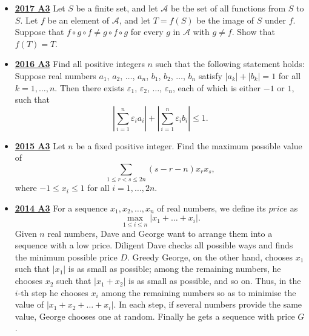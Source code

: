 \documentclass[11pt]{scrartcl}
\begin{document}
\begin{itemize}[leftmargin=*]
\begin{enumerate}[(1)]
    \item There exist distinct finite subsets $F$ and $G$ of $S$ such that $\sum_{x\in F}1/x=\sum_{x\in G}1/x$;
    \item There exists a positive rational number $r<1$ such that $\sum_{x\in F}1/x\neq r$ for all finite subsets $F$ of $S$.
\end{enumerate}
\item \href{https://artofproblemsolving.com/community/c6h1671322p10632599}{\textbf{2017 A3}} Let $S$ be a finite set, and let $\mathcal{A}$ be the set of all functions from $S$ to $S$. Let $f$ be an element of $\mathcal{A}$, and let $T=f(S)$ be the image of $S$ under $f$. Suppose that $f\circ g\circ f\ne g\circ f\circ g$ for every $g$ in $\mathcal{A}$ with $g\ne f$. Show that $f(T)=T$.
\item \href{https://artofproblemsolving.com/community/c6h1480716p8639312}{\textbf{2016 A3}} Find all positive integers $n$ such that the following statement holds: Suppose real numbers $a_1$, $a_2$, $\dots$, $a_n$, $b_1$, $b_2$, $\dots$, $b_n$ satisfy $|a_k|+|b_k|=1$ for all $k=1,\dots,n$. Then there exists $\varepsilon_1$, $\varepsilon_2$, $\dots$, $\varepsilon_n$, each of which is either $-1$ or $1$, such that
\[ \left| \sum_{i=1}^n \varepsilon_i a_i \right| + \left| \sum_{i=1}^n \varepsilon_i b_i \right| \leqslant 1. \]
\item \href{https://artofproblemsolving.com/community/c6h1268841p6622146}{\textbf{2015 A3}} 	Let $n$ be a fixed positive integer. Find the maximum possible value of\[ \sum_{1 \leqslant r < s \leqslant 2n} (s-r-n)x_rx_s, \]where $-1 \leqslant x_i \leqslant 1$ for all $i = 1, \dots , 2n$.
\item \href{https://artofproblemsolving.com/community/c6h1113180p5083537}{\textbf{2014 A3}} For a sequence $x_1,x_2,\dots,x_n$ of real numbers, we define its $\textit{price}$ as\[\max_{1\leqslant i\leqslant n}|x_1+\dots +x_i|.\]Given $n$ real numbers, Dave and George want to arrange them into a sequence with a low price. Diligent Dave checks all possible ways and finds the minimum possible price $D$. Greedy George, on the other hand, chooses $x_1$ such that $|x_1 |$ is as small as possible; among the remaining numbers, he chooses $x_2$ such that $|x_1 + x_2 |$ is as small as possible, and so on. Thus, in the $i$-th step he chooses $x_i$ among the remaining numbers so as to minimise the value of $|x_1 + x_2 + \dots + x_i |$. In each step, if several numbers provide the same value, George chooses one at random. Finally he gets a sequence with price $G$. 


\end{itemize}
\end{document}

